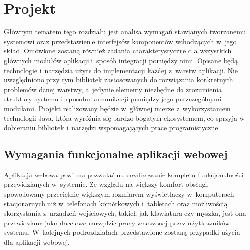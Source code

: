 \documentclass[11pt]{aghdpl}
\begin{document}

\chapter{Projekt}
\label{cha:dobor_technologii_i_narzedzi}

Głównym tematem tego rozdziału jest analiza wymagań stawianych tworzonemu systemowi oraz przedstawienie interfejsów komponentów wchodzących w~jego skład. Omówione zostaną również zadania charakterystyczne dla wszystkich głównych modułów aplikacji i~sposób integracji pomiędzy nimi. Opisane będą technologie i~narzędzia użyte do implementacji każdej z~warstw aplikacji. Nie uwzględniono przy tym bibliotek zastosowanych do rozwiązania konkretnych problemów danej warstwy, a~jedynie elementy niezbędne do zrozumienia struktury systemu i~sposobu komunikacji pomiędzy jego poszczególnymi modułami. Projekt realizowany będzie w~głównej mierze z~wykorzystaniem technologii Java, która wyróżnia się bardzo bogatym ekosystemem, co sprzyja w dobieraniu bibliotek i~narzędzi wspomagających prace programistyczne.

\section {Wymagania funkcjonalne aplikacji webowej}

Aplikacja webowa powinna pozwalać na zrealizowanie kompletu funkcjonalności przewidzianych w~systemie. Ze względu na większy komfort obsługi, spowodowany przeciętnie większym rozmiarem wyświetlaczy w~komputerach stacjonarnych niż w~telefonach komórkowych i~tabletach oraz możliwością skorzystania z~urządzeń wejściowych, takich jak klawiatura czy myszka, jest ona przewidziana jako docelowe narzędzie pracy wnoszonej przez użytkowników systemu. W~kolejnych podrozdziałach przedstawione zostaną przypadki użycia dla aplikacji webowej.

\def\useCaseNazwa{Funkcja}
\def\useCaseUzytkownik{Zarejestrowany użytkownik (lekarz)}
\def\useCaseAktor{Aktor}
\def\useCaseWarPocz{Warunki początkowe}
\def\useCaseScenAlt{Scenariusz alternatywny}
\def\useCaseScenBaz{Przebieg interakcji}
\def\useCaseWarKonc{Warunki końcowe}
\def\useCaseWyjatek{Wyjątek}
\def\useCaseZdarzInicj{Zdarzenie inicjujące}
\def\useCaseEnd{Scenariusz jest przerywany.}

%
%
\newcommand{\useCaseContinue}[1]{Scenariusz jest kontynuowany od punktu #1.}
\end{document}
